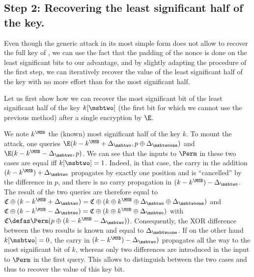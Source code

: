 \subsection{Step 2: Recovering the least significant half of the key.}

Even though the generic attack in its most simple form does not allow to recover the full key
of \proestotr,
we can use the fact that the padding of the nonce is done on the least significant
bits to our advantage, and by slightly adapting the procedure of the first step, we can iteratively recover the value
of the least significant half of the key with no more effort than for the most significant half.

Let us first show how we can recover the most significant bit of the least significant half of
the key $k[\msbtwo]$ (\ie the first bit for which we cannot use the previous method)
after a single encryption by $\E$. 

We note $k^\MSB$ the (known) most significant half of the key $k$.
To mount the attack, one queries $\E(k - k^\MSB + \Delta_\msbtwo, p \oplus \Delta_{\msbtwoone})$ and
$\E(k - k^\MSB - \Delta_\msbtwo, p)$. We can see that the inputs to $\Perm$ in these two cases are equal
iff $k[\msbtwo] = 1$. Indeed, in that case,
the carry in the addition $(k - k^\MSB) + \Delta_\msbtwo$ propagates by exactly one position and is ``cancelled'' by
the difference in $p$, and there is no carry propagation in $(k - k^\MSB) - \Delta_\msbtwo$.
The result of the two queries are therefore equal to
$\mathfrak{C} \oplus (k - k^\MSB + \Delta_\msbtwo) = \mathfrak{C} \oplus (k \oplus k^\MSB \oplus \Delta_\msbtwo \oplus \Delta_\msbtwoone)$ and
$\mathfrak{C} \oplus (k - k^\MSB - \Delta_\msbtwo) = \mathfrak{C} \oplus (k \oplus k^\MSB \oplus \Delta_\msbtwo)$
with $\mathfrak{C} \defas \Perm(p \oplus (k - k^\MSB - \Delta_\msbtwo))$.
Consequently, the XOR difference between the two results is known and equal to $\Delta_\msbtwoone$.
If on the other hand
$k[\msbtwo] = 0$, the carry in $(k - k^\MSB) - \Delta_\msbtwo)$ propagates all the way to the most significant bit of $k$, whereas only
two differences are introduced in the input to $\Perm$ in the first query. This allows to distinguish between the two cases and thus to recover the value of this key bit.

